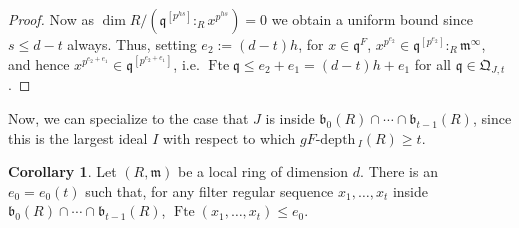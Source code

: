 \documentclass{amsproc}
\theoremstyle{definition}
\newtheorem{corollary}[theorem]{Corollary}
\theoremstyle{remark}
\numberwithin{equation}{section}
\newcommand{\fm}{\mathfrak{m}}
\newcommand{\fb}{\mathfrak{b}}
\newcommand{\fq}{\mathfrak{q}}
\newcommand{\fbp}[1]{\left[ #1 \right]}
\newcommand{\fte}{\operatorname{Fte}}
\newcommand{\gfdp}{gF\text{-depth}\,}
\newcommand{\fQ}{\mathfrak{Q}}
\begin{document}
\begin{proof}
Now as $\dim R/\left(\fq^{\fbp{p^{hs}}}:_R x^{p^{hs}}\right) = 0$ we obtain a uniform bound since $s \le d-t$ always. Thus, setting $e_2 := (d-t)h$, for $x \in \fq^F$, $x^{p^{e_2}} \in \fq^{\fbp{p^{e_2}}} :_R \fm^{\infty}$, and hence $x^{p^{e_2+e_1}} \in \fq^{\fbp{p^{e_2+e_1}}}$, i.e. $\fte \fq \le e_2 + e_1 = (d-t)h+e_1$ for all $\fq \in \fQ_{J,t}$.
\end{proof}

Now, we can specialize to the case that $J$ is inside $\fb_0(R) \cap \cdots \cap \fb_{t-1}(R)$, since this is the largest ideal $I$ with respect to which $\gfdp_I(R) \ge t$.

\begin{corollary}
Let $(R,\fm)$ be a local ring of dimension $d$. There is an $e_0=e_0(t)$ such that, for any filter regular sequence $x_1,\ldots,x_t$ inside $\fb_0(R) \cap \cdots \cap \fb_{t-1}(R)$, $\fte (x_1,\ldots,x_t) \le e_0$.
\end{corollary}



\end{document}
